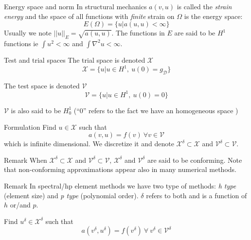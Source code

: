 \begin{frame}{Energy space and norm}
  In structural mechanics $a(v,u)$ is called the \emph{strain energy} and the space of all functions with \emph{finite} strain on $\Omega$ is the energy space:
  \begin{equation}
    \label{eq:23}
    E(\Omega) = \{u | a(u,u) < \infty \}
  \end{equation}
  Usually we note $||u||_E = \sqrt{a(u,u)}$. The functions in $E$ are
  said to be $H^1$ functions ie $\int u^2 < \infty$ and $\int \nabla^2 u <
  \infty$.
\end{frame}

\begin{frame}{Test and trial spaces}
  The trial space  is denoted $\mathcal{X}$
  \begin{equation}
    \label{eq:24}
    \mathcal{X} = \{ u | u \in H^1,\ u(0) = g_{\mathcal{D}}\}
  \end{equation}

  The test space  is denoted $\mathcal{V}$
  \begin{equation}
    \label{eq:25}
    \mathcal{V} = \{ u | u \in H^1,\ u(0) = 0 \}
  \end{equation}

  $\mathcal{V}$ is also said to be $H^1_0$ (``0'' refers to the fact we have an homogeneous space )
\end{frame}

\begin{frame}{Formulation}
  Find $u \in \mathcal{X}$ such that
  \begin{equation}
    \label{eq:26}
    a(v, u) = f(v)\ \forall v \in \mathcal{V}
  \end{equation}
  which is infinite dimensional. We  discretize it and denote
  $\mathcal{X}^{\delta} \subset \mathcal{X}$ and $\mathcal{V}^{\delta}
  \subset \mathcal{V}$.

  \begin{block}{Remark}
    When $\mathcal{X}^{\delta} \subset \mathcal{X}$ and
    $\mathcal{V}^{\delta} \subset \mathcal{V}$, $\mathcal{X}^\delta$
    and $\mathcal{V}^\delta$ are said to be conforming. Note that
    non-conforming approximations appear also in many numerical methods.
  \end{block}

  \begin{block}{Remark}
  In spectral/hp element methods we have two type of methods: \emph{h
    type} (element size) and \emph{p type} (polynomial
  order). $\delta$ refers to both and is a function of $h$ or/and $p$.
  \end{block}

  Find $u^\delta \in \mathcal{X}^\delta$ such that
  \begin{equation}
    \label{eq:27}
    a(v^\delta, u^\delta) = f(v^\delta)\ \forall\ v^\delta \in \mathcal{V}^\delta
  \end{equation}
\end{frame}

